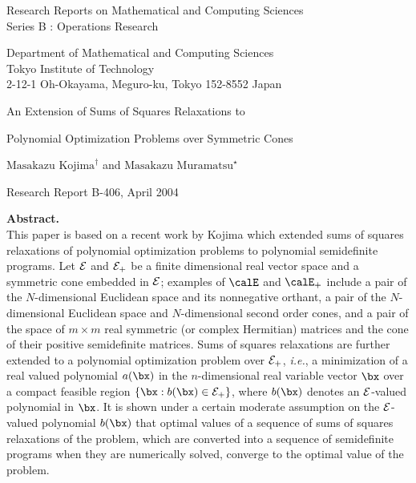 
\begin{center}
Research Reports on Mathematical and Computing Sciences \\
Series B : Operations Research
   
\vspace{0.3cm}

Department of Mathematical and Computing Sciences \\
      Tokyo Institute of Technology \\
      2-12-1 Oh-Okayama, Meguro-ku, Tokyo 152-8552 Japan

\vspace{1cm}

\begin{large}
{An Extension of Sums of Squares Relaxations to 

\medskip

Polynomial Optimization Problems over Symmetric Cones 
} 
\end{large} 

\vspace{0.5cm}

$\mbox{Masakazu Kojima}^{\dagger}$ and
$\mbox{Masakazu Muramatsu}^{\star}$

\vspace{0.3cm}

Research Report B-406, April 2004

\end{center}

\vspace{0.1cm}

\noindent
{\bf Abstract.} \vspace{0.1cm} \\


This paper is based on a recent work by Kojima which extended 
sums of squares relaxations of polynomial optimization problems
 to polynomial semidefinite programs. 
Let ${\cal E}$ and ${\cal E}_+$ be a finite dimensional real vector space 
and a symmetric cone embedded in ${\cal E}$;
examples of $\calE$ and $\calE_+$ include
a pair of the $N$-dimensional Euclidean space and its 
nonnegative orthant, 
a pair of the $N$-dimensional 
Euclidean space and $N$-dimensional second order cones, and a pair of 
the space of $m \times m$ real symmetric (or complex Hermitian) matrices  
and the cone of their positive semidefinite matrices.  
Sums of squares relaxations
are further extended to 
a polynomial optimization problem over  ${\cal E}_+$, 
{\it i.e.}, a minimization of a  
real valued polynomial $a(\bx)$  in the $n$-dimensional real 
variable vector $\bx$ %
over a compact feasible region 
$\{ \bx : b(\bx) \in {\cal E}_+\}$,  
where $b(\bx)$ denotes an $\cal E$-valued polynomial in $\bx$.  
It is shown under a certain moderate assumption on the $\cal E$-valued polynomial $b(\bx)$ 
that optimal values of a sequence of sums of squares relaxations of the 
problem, which are converted into a sequence of semidefinite programs when they are 
numerically solved, converge to the optimal value of the problem. 

